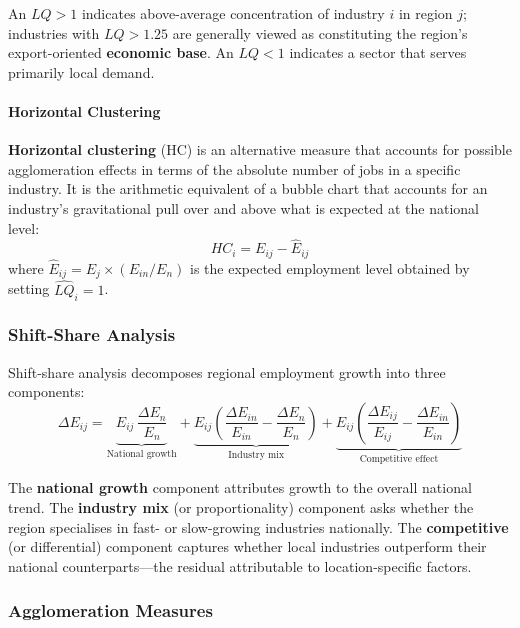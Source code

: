 An $LQ > 1$ indicates above-average concentration of industry $i$ in region
$j$; industries with $LQ > 1.25$ are generally viewed as constituting the
region's export-oriented \textbf{economic base}.
An $LQ < 1$ indicates a sector that serves primarily local demand.

\paragraph{Horizontal Clustering}

\textbf{Horizontal clustering} (HC) is an alternative measure that accounts
for possible agglomeration effects in terms of the absolute number of jobs
in a specific industry. It is the arithmetic equivalent of a bubble chart
that accounts for an industry's gravitational pull over and above what is
expected at the national level:
\begin{equation}
  HC_i = E_{ij} - \hat{E}_{ij}
\end{equation}
where $\hat{E}_{ij} = E_j \times (E_{in}/E_n)$ is the expected employment
level obtained by setting $\widehat{LQ}_i = 1$.

\subsubsection{Shift-Share Analysis}

Shift-share analysis decomposes regional employment growth into three
components:
\begin{equation}
  \Delta E_{ij} = \underbrace{E_{ij}\,\frac{\Delta E_n}{E_n}}_{\text{National growth}}
  + \underbrace{E_{ij}\!\left(\frac{\Delta E_{in}}{E_{in}} - \frac{\Delta E_n}{E_n}\right)}_{\text{Industry mix}}
  + \underbrace{E_{ij}\!\left(\frac{\Delta E_{ij}}{E_{ij}} - \frac{\Delta E_{in}}{E_{in}}\right)}_{\text{Competitive effect}}
\end{equation}

The \textbf{national growth} component attributes growth to the overall
national trend. The \textbf{industry mix} (or proportionality) component
asks whether the region specialises in fast- or slow-growing industries
nationally. The \textbf{competitive} (or differential) component captures
whether local industries outperform their national counterparts---the
residual attributable to location-specific factors.


\subsubsection{Agglomeration Measures}

